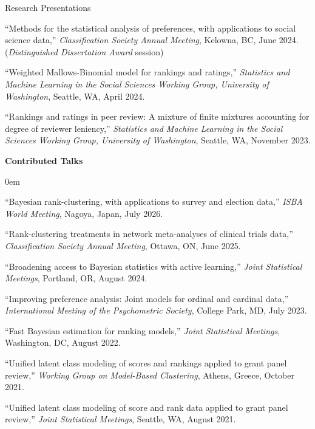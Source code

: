\documentclass{resume} %
\begin{document}
\begin{rSection}{Research Presentations}
\begin{etaremune}
\item ``Methods for the statistical analysis of preferences, with applications to social science data,'' \textit{Classification Society Annual Meeting}, Kelowna, BC, June 2024. (\textit{Distinguished Dissertation Award} session)
\item ``Weighted Mallows-Binomial model for rankings and ratings,'' \textit{Statistics and Machine Learning in the Social Sciences Working Group, University of Washington}, Seattle, WA, April 2024.
\item ``Rankings and ratings in peer review: A mixture of finite mixtures accounting for degree of reviewer leniency,'' \textit{Statistics and Machine Learning in the Social Sciences Working Group, University of Washington}, Seattle, WA, November 2023.
\end{etaremune}

\noindent\textbf{Contributed Talks}
\begin{etaremune}
\itemsep0em
\item ``Bayesian rank-clustering, with applications to survey and election data,'' \textit{ISBA World Meeting}, Nagoya, Japan, July 2026.
\item ``Rank-clustering treatments in network meta-analyses of clinical trials data,'' \textit{Classification Society Annual Meeting}, Ottawa, ON, June 2025.
\item ``Broadening access to Bayesian statistics with active learning,'' \textit{Joint Statistical Meetings}, Portland, OR, August 2024.
\item ``Improving preference analysis: Joint models for ordinal and cardinal data,'' \textit{International Meeting of the Psychometric Society}, College Park, MD, July 2023.
\item ``Fast Bayesian estimation for ranking models,'' \textit{Joint Statistical Meetings}, Washington, DC, August 2022.
\item ``Unified latent class modeling of scores and rankings applied to grant panel review,'' \textit{Working Group on Model-Based Clustering}, Athens, Greece, October 2021.
\item ``Unified latent class modeling of score and rank data applied to grant panel review,'' \textit{Joint Statistical Meetings}, Seattle, WA, August 2021.
\end{etaremune}


\end{rSection}
\end{document}
